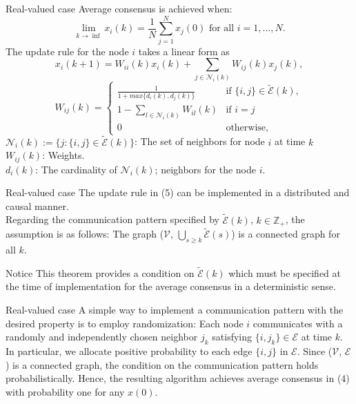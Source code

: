 \documentclass[xcolor={dvipsnames}]{beamer}
\begin{document}
	\begin{frame}{Real-valued case}
			Average consensus is achieved when:
			\begin{equation}
				\lim_{k \rightarrow \inf} x_i(k) = \frac{1}{N} \sum_{j=1}^{N} x_j(0) \text{ for all } i = 1, ..., N.
			\end{equation}
		The update rule for the node $i$ takes a linear form as
		\begin{equation}
			x_i(k+1)=W_{ii}(k) x_i(k) + \sum_{j \in \mathscr{N}_i(k)} W_{ij}(k) x_j(k),
		\end{equation}
		\begin{equation}
			W_{ij}(k)=\begin{cases}
				\frac{1}{1+max\{d_{i}(k),d_{j}(k)\}} & \text{if }\{i,j\}\in \ensuremath{\tilde{\mathscr{E}}(k),}\\
				1-\sum_{l\in\mathscr{N}_{i}(k)}W_{il}(k) & \text{if }i=j\\
				0 & \text{otherwise,}
			\end{cases}
		\end{equation}
	\alert{$\mathscr{N}_i(k) := \{j : \{i, j\} \in \tilde{\mathscr{E}}(k)\}$}: The set of 
    neighbors for node $i$ at time $k$\\
	\alert{$W_{ij}(k)$}: Weights.\\
	\alert{$d_i(k)$: } The cardinality of $\mathscr{N}_i(k)$; neighbors for the node $i$.
	\end{frame}

	\begin{frame}{Real-valued case}
		The update rule in (5) can be implemented in a distributed and causal manner.\\
		Regarding the communication pattern specified by 
        $\tilde{\mathscr{E}}(k)$, $k \in \mathbb{Z}_+$, the assumption is as follows: 
        The graph ($\mathscr{V}$, $\bigcup_{s \geq k} \tilde{\mathscr{E}}(s)$) is a connected graph for all $k$.
		\begin{alertblock}{Notice}
			This theorem provides a condition on $\tilde{\mathscr{E}}(k)$ which must be 
            specified at the time of implementation for the average consensus in a deterministic sense.
		\end{alertblock}
	\end{frame}
	
	\begin{frame}{Real-valued case}
		A simple way to implement a communication pattern with the desired property is to employ 
        randomization: Each node $i$ communicates with a randomly and independently chosen neighbor 
        $j_k$ satisfying $\{i, j_k\} \in \mathscr{E}$ at time $k$. In particular, we allocate positive 
        probability to each edge $\{i, j\}$ in $\mathscr{E}$. Since ($\mathscr{V}$, $\mathscr{E}$) is a 
        connected graph, the condition on the communication pattern holds probabilistically. 
        Hence, the resulting algorithm achieves average consensus in (4) with probability one for any $x(0)$.	
	\end{frame}
\end{document}
